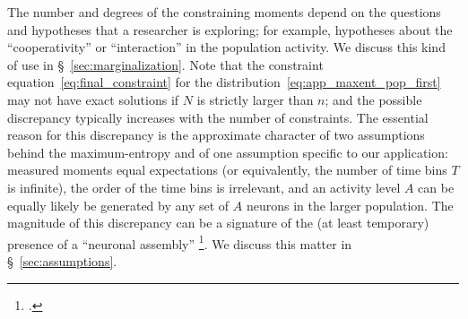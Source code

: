 \documentclass[\ifafour a4paper,12pt,\else a5paper,10pt,\fi%
onecolumn,oneside,article,%
british%
]{memoir}
\theoremstyle{remark}
\theoremstyle{innote}
\newcommand*{\citep}{\footcites}
\renewcommand*{\|}{\nonscript\,\vert\nonscript\;\mathopen{}}
\newcommand*{\sect}{\S}%
\newcommand*{\chap}{ch.}%
\newcommand*{\yAv}{A}
\newcommand*{\yA}{\yAv}%
\begin{document}
The number and degrees of the constraining moments depend on the questions
and hypotheses that a researcher is exploring; for example, hypotheses
about the \enquote{cooperativity} or \enquote{interaction} in the population
activity. We discuss this kind of use in \sect~\ref{sec:marginalization}.
Note that the constraint equation~\eqref{eq:final_constraint} for the
distribution~\eqref{eq:app_maxent_pop_first} may not have exact solutions
if $N$ is strictly larger than $n$; and the possible discrepancy typically
increases with the number of constraints. The essential reason for this
discrepancy is the approximate character of two assumptions behind the
maximum-entropy and of one assumption specific to our application: measured
moments equal expectations (or equivalently, the number of time bins $T$ is
infinite), the order of the time bins is irrelevant, and an activity level
$\yA$ can be equally likely be generated by any set of $\yA$ neurons in the
larger population. The magnitude of this discrepancy can be a signature of the
(at least temporary) presence of a \enquote{neuronal assembly}
\citep[\chap~12]{gerstneretal2014}{hebb1949_r2002}. We discuss this matter
in \sect~\ref{sec:assumptions}.



\bigskip
\end{document}
